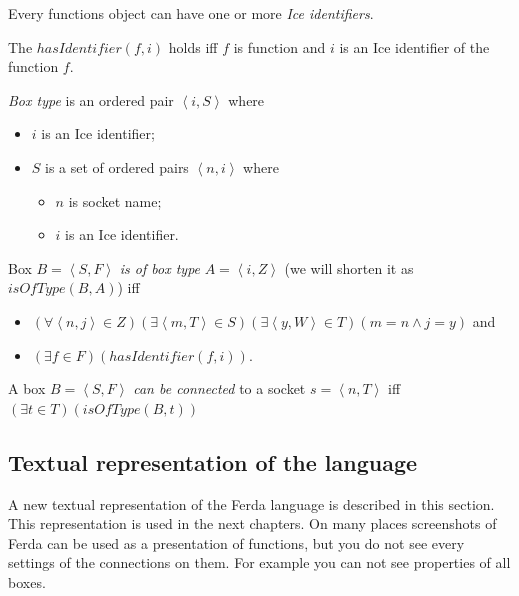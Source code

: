 \documentclass[a4paper,12pt]{book}
\begin{document}
Every functions object can have one or more \emph{Ice identifiers}.

\begin{mydef}
The \emph{$hasIdentifier(f,i)$} holds iff $f$ is function and $i$ is an Ice identifier of the function $f$.
\end{mydef}

\begin{mydef}
\emph{Box type} is an ordered pair $\left<i,S\right>$ where
\begin{itemize}
	\item $i$ is an Ice identifier;
	\item $S$ is a set of ordered pairs $\left<n,i\right>$ where
	\begin{itemize}
		\item $n$ is socket name;
		\item $i$ is an Ice identifier.
	\end{itemize}
\end{itemize}
\end{mydef}

\begin{mydef}
Box $B=\left<S,F\right>$ \emph{is of box type} $A=\left<i,Z\right>$ (we will shorten it as $isOfType(B,A)$) iff 
\begin{itemize}
	\item $(\forall \left<n,j\right>\in Z)(\exists \left<m,T\right>\in S)(\exists \left<y,W\right>\in T)(m=n \wedge j=y)$ and
	\item $(\exists f\in F)(hasIdentifier(f,i))$.
\end{itemize}
\end{mydef}

\begin{mydef}
A box $B=\left<S,F\right>$ \emph{can be connected} to a socket $s=\left<n,T\right>$ iff $(\exists t\in T)(isOfType(B,t))$
\end{mydef}

\subsection{Textual representation of the language}
\label{sec:formalisation}
A new textual representation of the Ferda language is described in this section. This representation is used in the next chapters. On many places screenshots of Ferda can be used as a presentation of functions, but you do not see every settings of the connections on them. For example you can not see properties of all boxes.
\end{document}
